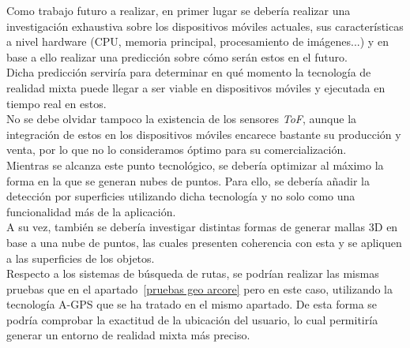 Como trabajo futuro a realizar, en primer lugar se debería realizar una investigación exhaustiva sobre los dispositivos móviles actuales, sus características a nivel hardware (CPU, memoria principal, procesamiento de imágenes...) y en base a ello realizar una predicción sobre cómo serán estos en el futuro.\\ 

Dicha predicción serviría para determinar en qué momento la tecnología de realidad mixta puede llegar a ser viable en dispositivos móviles y ejecutada en tiempo real en estos.\\

No se debe olvidar tampoco la existencia de los sensores \textit{ToF}, aunque la integración de estos en los dispositivos móviles encarece bastante su producción y venta, por lo que no lo consideramos óptimo para su comercialización.\\

Mientras se alcanza este punto tecnológico, se debería optimizar al máximo la forma en la que se generan nubes de puntos. Para ello, se debería añadir la detección por superficies utilizando dicha tecnología y no solo como una funcionalidad más de la aplicación.\\

A su vez, también se debería investigar distintas formas de generar mallas 3D en base a una nube de puntos, las cuales presenten coherencia con esta y se apliquen a las superficies de los objetos.\\ 

Respecto a los sistemas de búsqueda de rutas, se podrían realizar las mismas pruebas que en el apartado~\ref{pruebas geo arcore} pero en este caso, utilizando la tecnología A-GPS que se ha tratado en el mismo apartado. De esta forma se podría comprobar la exactitud de la ubicación del usuario, lo cual permitiría generar un entorno de realidad mixta más preciso. 
